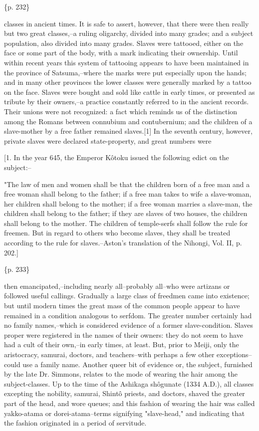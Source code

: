 \{p. 232\}

classes in ancient times. It is safe to assert, however, that there were then really but two great classes,--a ruling oligarchy, divided into many grades; and a subject population, also divided into many grades. Slaves were tattooed, either on the face or some part of the body, with a mark indicating their ownership. Until within recent years this system of tattooing appears to have been maintained in the province of Satsuma,--where the marks were put especially upon the hands; and in many other provinces the lower classes were generally marked by a tattoo on the face. Slaves were bought and sold like cattle in early times, or presented as tribute by their owners,--a practice constantly referred to in the ancient records. Their unions were not recognized: a fact which reminds us of the distinction among the Romans between connubium and contubernium; and the children of a slave-mother by a free father remained slaves.[1] In the seventh century, however, private slaves were declared state-property, and great numbers were

[1. In the year 645, the Emperor Kôtoku issued the following edict on the subject:--

"The law of men and women shall be that the children born of a free man and a free woman shall belong to the father; if a free man takes to wife a slave-woman, her children shall belong to the mother; if a free woman marries a slave-man, the children shall belong to the father; if they are slaves of two houses, the children shall belong to the mother. The children of temple-serfs shall follow the rule for freemen. But in regard to others who become slaves, they shall be treated according to the rule for slaves.--Aston's translation of the Nihongi, Vol. II, p. 202.]

\{p. 233\}

then emancipated,--including nearly all--probably all--who were artizans or followed useful callings. Gradually a large class of freedmen came into existence; but until modern times the great mass of the common people appear to have remained in a condition analogous to serfdom. The greater number certainly had no family names,--which is considered evidence of a former slave-condition. Slaves proper were registered in the names of their owners: they do not seem to have had a cult of their own,--in early times, at least. But, prior to Meiji, only the aristocracy, samurai, doctors, and teachers--with perhaps a few other exceptions--could use a family name. Another queer bit of evidence or, the subject, furnished by the late Dr. Simmons, relates to the mode of wearing the hair among the subject-classes. Up to the time of the Ashikaga shôgunate (1334 A.D.), all classes excepting the nobility, samurai, Shintô priests, and doctors, shaved the greater part of the head, and wore queues; and this fashion of wearing the hair was called yakko-atama or dorei-atama--terms signifying "slave-head," and indicating that the fashion originated in a period of servitude.


